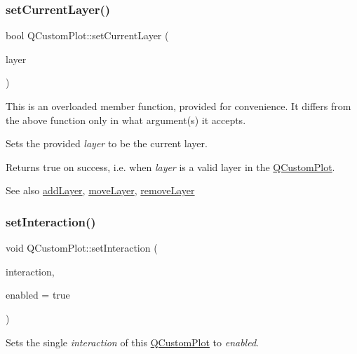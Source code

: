 \subsubsection{\texorpdfstring{set\+Current\+Layer()}{setCurrentLayer()}\hspace{0.1cm}{\footnotesize\ttfamily [2/2]}}
{\footnotesize\ttfamily bool Q\+Custom\+Plot\+::set\+Current\+Layer (\begin{DoxyParamCaption}\item[{\mbox{\hyperlink{class_q_c_p_layer}{Q\+C\+P\+Layer}} $\ast$}]{layer }\end{DoxyParamCaption})}

This is an overloaded member function, provided for convenience. It differs from the above function only in what argument(s) it accepts.

Sets the provided {\itshape layer} to be the current layer.

Returns true on success, i.\+e. when {\itshape layer} is a valid layer in the \mbox{\hyperlink{class_q_custom_plot}{Q\+Custom\+Plot}}.

\begin{DoxySeeAlso}{See also}
\mbox{\hyperlink{class_q_custom_plot_ad5255393df078448bb6ac83fa5db5f52}{add\+Layer}}, \mbox{\hyperlink{class_q_custom_plot_ae896140beff19424e9e9e02d6e331104}{move\+Layer}}, \mbox{\hyperlink{class_q_custom_plot_a40f75e342c5eaab6a86066a42a0e2a94}{remove\+Layer}} 
\end{DoxySeeAlso}
\mbox{\label{class_q_custom_plot_a422bf1bc6d56dac75a3d805d9a65902c}} 
\subsubsection{\texorpdfstring{set\+Interaction()}{setInteraction()}}
{\footnotesize\ttfamily void Q\+Custom\+Plot\+::set\+Interaction (\begin{DoxyParamCaption}\item[{const \mbox{\hyperlink{namespace_q_c_p_a2ad6bb6281c7c2d593d4277b44c2b037}{Q\+C\+P\+::\+Interaction}} \&}]{interaction,  }\item[{bool}]{enabled = {\ttfamily true} }\end{DoxyParamCaption})}

Sets the single {\itshape interaction} of this \mbox{\hyperlink{class_q_custom_plot}{Q\+Custom\+Plot}} to {\itshape enabled}.

